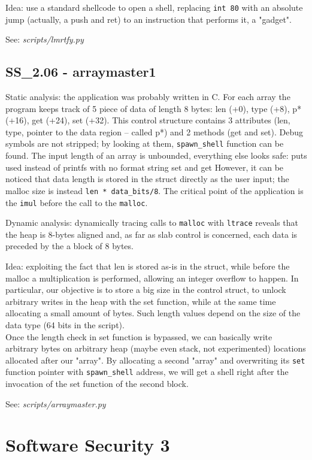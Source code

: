 Idea: use a standard shellcode to open a shell, replacing \texttt{int 80} with an absolute jump (actually, a push and ret) to an instruction that performs it, a "gadget".

See: \textit{scripts/lmrtfy.py}

\subsection{SS_2.06 - arraymaster1}
Static analysis: the application was probably written in C.
For each array the program keeps track of 5 piece of data of length 8 bytes: len (+0), type (+8), p* (+16), get (+24), set (+32).
This control structure contains 3 attributes (len, type, pointer to the data region -- called p*) and 2 methods (get and set).
Debug symbols are not stripped; by looking at them, \texttt{spawn_shell} function can be found.
The input length of an array is unbounded, everything else looks safe: puts used instead of printfs with no format string set and get 
However, it can be noticed that data length is stored in the struct directly as the user input; the malloc size is instead \texttt{len * data_bits/8}. 
The critical point of the application is the \texttt{imul} before the call to the \texttt{malloc}.

Dynamic analysis: dynamically tracing calls to \texttt{malloc} with \texttt{ltrace} reveals that the heap is 8-bytes aligned and, as far as slab control is concerned, each data is preceded by the a block of 8 bytes.

Idea: exploiting the fact that len is stored as-is in the struct, while before the malloc a multiplication is performed, allowing an integer overflow to happen.
In particular, our objective is to store a big size in the control struct, to unlock arbitrary writes in the heap with the set function, while at the same time allocating a small amount of bytes.
Such length values depend on the size of the data type (64 bits in the script). \\
Once the length check in set function is bypassed, we can basically write arbitrary bytes on arbitrary heap (maybe even stack, not experimented) locations allocated after our "array".
By allocating a second "array" and overwriting its \texttt{set} function pointer with \texttt{spawn_shell} address, we will get a shell right after the invocation of the set function of the second block.


See: \textit{scripts/arraymaster.py}

\section{Software Security 3}
